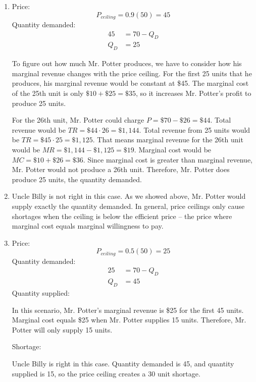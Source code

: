\documentclass{article}
\begin{document}
\begin{enumerate}
\begin{enumerate}
	\item Price:
		\begin{equation*}
		P_{ceiling} = 0.9(50) = 45
		\end{equation*}
		Quantity demanded:
		\begin{align*}
		45 &= 70 - Q_D \\
		Q_D &= 25
		\end{align*}
		
		To figure out how much Mr. Potter produces, we have to consider how his marginal revenue changes with the price ceiling. For the first 25 units that he produces, his marginal revenue would be constant at \$45. The marginal cost of the 25th unit is only $\$10 + \$25 = \$35$, so it increases Mr. Potter's profit to produce 25 units.
		
		For the 26th unit, Mr. Potter could charge $P = \$70 - \$26 = \$44$. Total revenue would be $TR = \$44 \cdot 26 = \$1{,}144$. Total revenue from 25 units would be $TR = \$45 \cdot 25 = \$1{,}125$. That means marginal revenue for the 26th unit would be $MR = \$1{,}144 - \$1{,}125 = \$19$. Marginal cost would be $MC = \$10 + \$26 = \$36$. Since marginal cost is greater than marginal revenue, Mr. Potter would not produce a 26th unit.
		Therefore, Mr. Potter does produce 25 units, the quantity demanded.
		
	\item Uncle Billy is not right in this case. As we showed above, Mr. Potter would supply exactly the quantity demanded. In general, price ceilings only cause shortages when the ceiling is below the efficient price -- the price where marginal cost equals marginal willingness to pay.
	
	\item Price:
		\begin{equation*}
		P_{ceiling} = 0.5(50) = 25
		\end{equation*}
		Quantity demanded:
		\begin{align*}
		25 &= 70 - Q_D \\
		Q_D &= 45
		\end{align*}
		Quantity supplied: 
		
		In this scenario, Mr. Potter's marginal revenue is \$25 for the first 45 units. Marginal cost equals \$25 when Mr. Potter supplies 15 units. Therefore, Mr. Potter will only supply 15 units. 
		
		Shortage:
		
		Uncle Billy is right in this case. Quantity demanded is 45, and quantity supplied is 15, so the price ceiling creates a 30 unit shortage.
		

\end{enumerate}
\end{enumerate}
\end{document}
